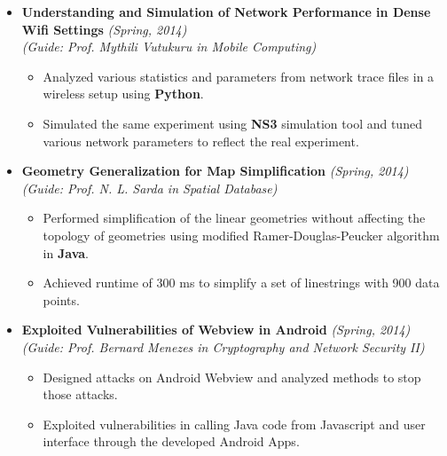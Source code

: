 \documentclass[a4paper,11pt]{article}
\begin{document}
\begin{description}
\begin{itemize}
\item \textbf{Understanding and Simulation of Network Performance in Dense Wifi Settings} \hfill \textit{(Spring, 2014)}\\
\textit{(Guide: Prof. Mythili Vutukuru in Mobile Computing)} 
\begin{itemize}
\item Analyzed various statistics and parameters from network trace files in a wireless setup using \textbf{Python}.
\item Simulated the same experiment using \textbf{NS3} simulation tool and tuned various network parameters to reflect the real experiment.
\end{itemize}
\end{itemize}
\item

\begin{itemize}
\item \textbf{Geometry Generalization for Map Simplification} \hfill \textit{(Spring, 2014)}\\
\textit{(Guide: Prof. N. L. Sarda in Spatial Database)} 
\begin{itemize}
\item Performed simplification of the linear geometries without affecting the topology of geometries using modified Ramer-Douglas-Peucker algorithm in \textbf{Java}.
\item Achieved runtime of 300 ms to simplify a set of linestrings with 900 data points.
\end{itemize}
\end{itemize}

\item

\begin{itemize}
\item \textbf{Exploited Vulnerabilities of Webview in Android} \hfill \textit{(Spring, 2014)}\\
\textit{(Guide: Prof. Bernard Menezes in Cryptography and Network Security II)} 
\begin{itemize}
\item Designed attacks on Android Webview and analyzed methods to stop those attacks.
\item Exploited vulnerabilities in calling Java code from Javascript and user interface through the developed Android Apps.
\end{itemize}
\end{itemize}


\end{description}
\end{document}
